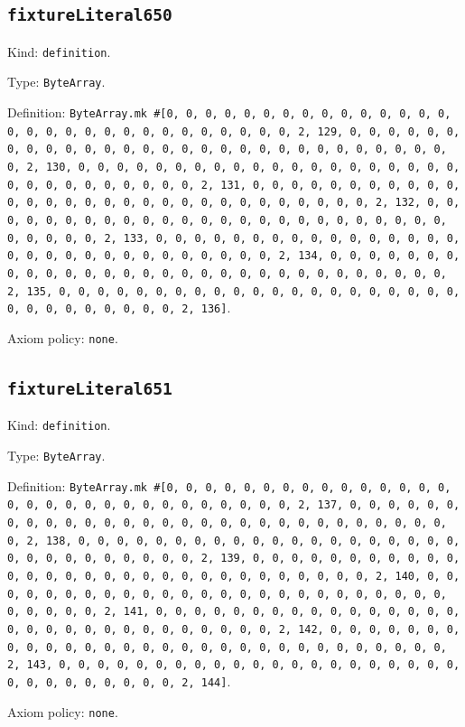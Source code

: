 \documentclass[11pt]{article}
\begin{document}
\subsection*{\texttt{fixtureLiteral650}}
\noindent Kind: \texttt{definition}.\par
\noindent Type: \texttt{ByteArray}.\par
\noindent Definition: \texttt{ByteArray.mk \#[0, 0, 0, 0, 0, 0, 0, 0, 0, 0, 0, 0, 0, 0, 0, 0, 0, 0, 0, 0, 0, 0, 0, 0, 0, 0, 0, 0, 0, 0, 2, 129, 0, 0, 0, 0, 0, 0, 0, 0, 0, 0, 0, 0, 0, 0, 0, 0, 0, 0, 0, 0, 0, 0, 0, 0, 0, 0, 0, 0, 0, 0, 2, 130, 0, 0, 0, 0, 0, 0, 0, 0, 0, 0, 0, 0, 0, 0, 0, 0, 0, 0, 0, 0, 0, 0, 0, 0, 0, 0, 0, 0, 0, 0, 2, 131, 0, 0, 0, 0, 0, 0, 0, 0, 0, 0, 0, 0, 0, 0, 0, 0, 0, 0, 0, 0, 0, 0, 0, 0, 0, 0, 0, 0, 0, 0, 2, 132, 0, 0, 0, 0, 0, 0, 0, 0, 0, 0, 0, 0, 0, 0, 0, 0, 0, 0, 0, 0, 0, 0, 0, 0, 0, 0, 0, 0, 0, 0, 2, 133, 0, 0, 0, 0, 0, 0, 0, 0, 0, 0, 0, 0, 0, 0, 0, 0, 0, 0, 0, 0, 0, 0, 0, 0, 0, 0, 0, 0, 0, 0, 2, 134, 0, 0, 0, 0, 0, 0, 0, 0, 0, 0, 0, 0, 0, 0, 0, 0, 0, 0, 0, 0, 0, 0, 0, 0, 0, 0, 0, 0, 0, 0, 2, 135, 0, 0, 0, 0, 0, 0, 0, 0, 0, 0, 0, 0, 0, 0, 0, 0, 0, 0, 0, 0, 0, 0, 0, 0, 0, 0, 0, 0, 0, 0, 2, 136]}.\par
\noindent Axiom policy: \texttt{none}.\par
\subsection*{\texttt{fixtureLiteral651}}
\noindent Kind: \texttt{definition}.\par
\noindent Type: \texttt{ByteArray}.\par
\noindent Definition: \texttt{ByteArray.mk \#[0, 0, 0, 0, 0, 0, 0, 0, 0, 0, 0, 0, 0, 0, 0, 0, 0, 0, 0, 0, 0, 0, 0, 0, 0, 0, 0, 0, 0, 0, 2, 137, 0, 0, 0, 0, 0, 0, 0, 0, 0, 0, 0, 0, 0, 0, 0, 0, 0, 0, 0, 0, 0, 0, 0, 0, 0, 0, 0, 0, 0, 0, 2, 138, 0, 0, 0, 0, 0, 0, 0, 0, 0, 0, 0, 0, 0, 0, 0, 0, 0, 0, 0, 0, 0, 0, 0, 0, 0, 0, 0, 0, 0, 0, 2, 139, 0, 0, 0, 0, 0, 0, 0, 0, 0, 0, 0, 0, 0, 0, 0, 0, 0, 0, 0, 0, 0, 0, 0, 0, 0, 0, 0, 0, 0, 0, 2, 140, 0, 0, 0, 0, 0, 0, 0, 0, 0, 0, 0, 0, 0, 0, 0, 0, 0, 0, 0, 0, 0, 0, 0, 0, 0, 0, 0, 0, 0, 0, 2, 141, 0, 0, 0, 0, 0, 0, 0, 0, 0, 0, 0, 0, 0, 0, 0, 0, 0, 0, 0, 0, 0, 0, 0, 0, 0, 0, 0, 0, 0, 0, 2, 142, 0, 0, 0, 0, 0, 0, 0, 0, 0, 0, 0, 0, 0, 0, 0, 0, 0, 0, 0, 0, 0, 0, 0, 0, 0, 0, 0, 0, 0, 0, 2, 143, 0, 0, 0, 0, 0, 0, 0, 0, 0, 0, 0, 0, 0, 0, 0, 0, 0, 0, 0, 0, 0, 0, 0, 0, 0, 0, 0, 0, 0, 0, 2, 144]}.\par
\noindent Axiom policy: \texttt{none}.\par
\end{document}
